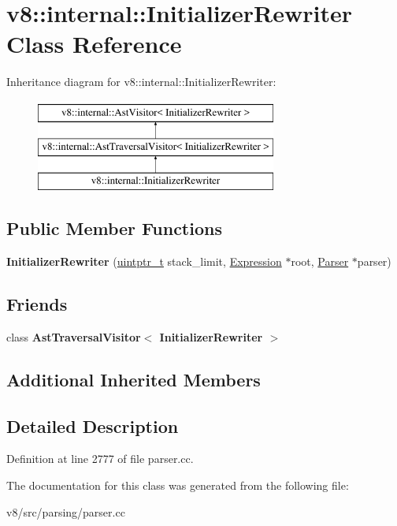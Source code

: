 \hypertarget{classv8_1_1internal_1_1InitializerRewriter}{}\section{v8\+:\+:internal\+:\+:Initializer\+Rewriter Class Reference}
\label{classv8_1_1internal_1_1InitializerRewriter}
Inheritance diagram for v8\+:\+:internal\+:\+:Initializer\+Rewriter\+:\begin{figure}[H]
\begin{center}
\leavevmode
\includegraphics[height=3.000000cm]{classv8_1_1internal_1_1InitializerRewriter}
\end{center}
\end{figure}
\subsection*{Public Member Functions}
\begin{DoxyCompactItemize}
\item 
\mbox{\label{classv8_1_1internal_1_1InitializerRewriter_acddf24aad49552f36586b3b23433258a}} 
{\bfseries Initializer\+Rewriter} (\mbox{\hyperlink{classuintptr__t}{uintptr\+\_\+t}} stack\+\_\+limit, \mbox{\hyperlink{classv8_1_1internal_1_1Expression}{Expression}} $\ast$root, \mbox{\hyperlink{classv8_1_1internal_1_1Parser}{Parser}} $\ast$parser)
\end{DoxyCompactItemize}
\subsection*{Friends}
\begin{DoxyCompactItemize}
\item 
\mbox{\label{classv8_1_1internal_1_1InitializerRewriter_a7658c7dc6f87141d86128c11caccb880}} 
class {\bfseries Ast\+Traversal\+Visitor$<$ Initializer\+Rewriter $>$}
\end{DoxyCompactItemize}
\subsection*{Additional Inherited Members}


\subsection{Detailed Description}


Definition at line 2777 of file parser.\+cc.



The documentation for this class was generated from the following file\+:\begin{DoxyCompactItemize}
\item 
v8/src/parsing/parser.\+cc\end{DoxyCompactItemize}
